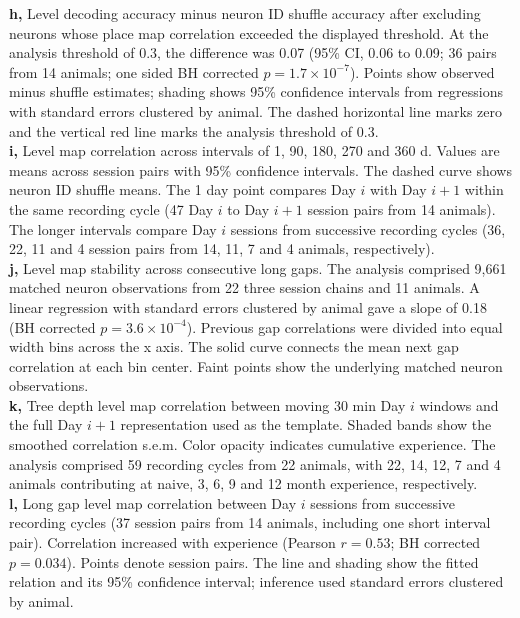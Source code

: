 \documentclass[fleqn,10pt]{wlscirep}
\makeatletter
\newcommand{\labeltoimage}[1]{%
  \begingroup
  \edef\@currentHref{\csname imagehref@#1\endcsname}%
  \label{#1}%
  \endgroup
}
\makeatother
\begin{document}
{\textbf{h,} Level decoding accuracy minus neuron ID shuffle accuracy after excluding neurons whose place map correlation exceeded the displayed threshold. At the analysis threshold of 0.3, the difference was 0.07 (95\% CI, 0.06 to 0.09; 36 pairs from 14 animals; one sided BH corrected $p=1.7\times10^{-7}$). Points show observed minus shuffle estimates; shading shows 95\% confidence intervals from regressions with standard errors clustered by animal. The dashed horizontal line marks zero and the vertical red line marks the analysis threshold of 0.3.\\
\textbf{i,} Level map correlation across intervals of 1, 90, 180, 270 and 360 d. Values are means across session pairs with 95\% confidence intervals. The dashed curve shows neuron ID shuffle means. The 1 day point compares Day $i$ with Day $i+1$ within the same recording cycle (47 Day $i$ to Day $i+1$ session pairs from 14 animals). The longer intervals compare Day $i$ sessions from successive recording cycles (36, 22, 11 and 4 session pairs from 14, 11, 7 and 4 animals, respectively).\\
\textbf{j,} Level map stability across consecutive long gaps. The analysis comprised 9,661 matched neuron observations from 22 three session chains and 11 animals. A linear regression with standard errors clustered by animal gave a slope of 0.18 (BH corrected $p=3.6\times10^{-4}$). Previous gap correlations were divided into equal width bins across the x axis. The solid curve connects the mean next gap correlation at each bin center. Faint points show the underlying matched neuron observations.\\
\textbf{k,} Tree depth level map correlation between moving 30 min Day $i$ windows and the full Day $i+1$ representation used as the template. Shaded bands show the smoothed correlation s.e.m. Color opacity indicates cumulative experience. The analysis comprised 59 recording cycles from 22 animals, with 22, 14, 12, 7 and 4 animals contributing at naive, 3, 6, 9 and 12 month experience, respectively.\\
\textbf{l,} Long gap level map correlation between Day $i$ sessions from successive recording cycles (37 session pairs from 14 animals, including one short interval pair). Correlation increased with experience (Pearson $r=0.53$; BH corrected $p=0.034$). Points denote session pairs. The line and shading show the fitted relation and its 95\% confidence interval; inference used standard errors clustered by animal.

}
\labeltoimage{fig:ed09}
\end{document}
